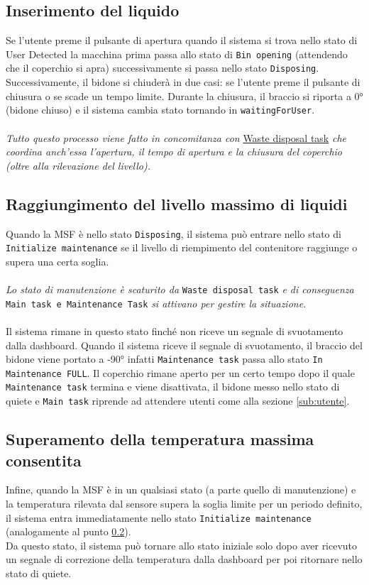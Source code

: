 \documentclass{report}
\begin{document}
\subsection{Inserimento del liquido}
\par {
Se l'utente preme il pulsante di apertura quando il sistema si trova nello stato di User Detected la macchina prima passa allo stato di \texttt{Bin opening} (attendendo che il coperchio si apra) successivamente si passa nello stato \texttt{Disposing}. Successivamente, il bidone si chiuderà in due casi: se l'utente preme il pulsante di chiusura o se scade un tempo limite. Durante la chiusura, il braccio si riporta a 0° (bidone chiuso) e il sistema cambia stato tornando in \texttt{waitingForUser}.\\ \\
\textit{
Tutto questo processo viene fatto in concomitanza con} \hyperref[fig:waste-task]{Waste disposal task} \textit{che coordina anch'essa l'apertura, il tempo di apertura e la chiusura del coperchio (oltre alla rilevazione del livello).
}
}
\subsection{Raggiungimento del livello massimo di liquidi}
\label{sub:liquids}
\par {
Quando la MSF è nello stato \texttt{Disposing}, il sistema può entrare nello stato di \texttt{Initialize maintenance} se il livello di riempimento del contenitore raggiunge o supera una certa soglia. 
\\
\\
\textit{Lo stato di manutenzione è scaturito da } \texttt{Waste disposal task} \textit{ e di conseguenza }\texttt{ Main task e Maintenance Task} \textit{ si attivano per gestire la situazione.}
\\
\\
Il sistema rimane in questo stato finché non riceve un segnale di svuotamento dalla dashboard. Quando il sistema riceve il segnale di svuotamento, il braccio del bidone viene portato a -90° infatti \texttt{Maintenance task} passa allo stato \texttt{In Maintenance FULL}. Il coperchio rimane aperto per un certo tempo dopo il quale \texttt{Maintenance task} termina e viene disattivata, il bidone messo nello stato di quiete e \texttt{Main task} riprende ad attendere utenti come alla sezione \ref{sub:utente}. 
}
\subsection{Superamento della temperatura massima consentita}
\par {
Infine, quando la MSF è in un qualsiasi stato (a parte quello di manutenzione) e la temperatura rilevata dal sensore supera la soglia limite per un periodo definito, il sistema entra immediatamente nello stato \texttt{Initialize maintenance} (analogamente al punto \ref{sub:liquids}).\\
Da questo stato, il sistema può tornare allo stato iniziale solo dopo aver ricevuto un segnale di correzione della temperatura dalla dashboard per poi ritornare nello stato di quiete.
}
\end{document}
